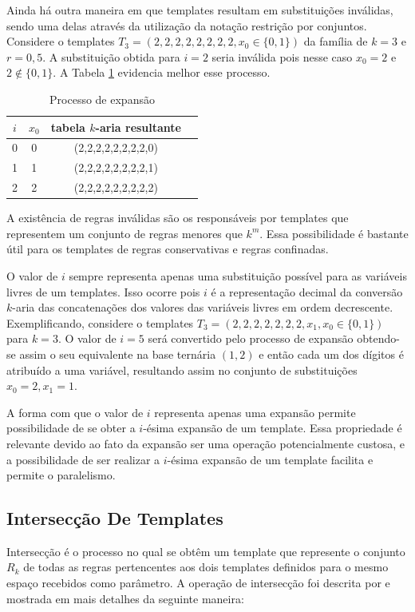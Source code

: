 \documentclass[12pt,a4paper]{article}
\begin{document}
	Ainda há outra maneira em que templates resultam em substituições inválidas, sendo uma delas através da utilização da notação restrição por conjuntos. Considere o templates $T_3 = (2,2,2,2,2,2,2,2,x_0\in \{0,1\})$ da família de $k=3$ e $r=0,5$. A substituição obtida para $i = 2$ seria inválida pois nesse caso $x_0 = 2$ e $2 \notin \{0,1\}$. A Tabela \ref{tab:invalideExpansion2} evidencia melhor esse processo.

	\begin{table}[h!]
	\centering
	\caption{Processo de expansão}
	{
		\vspace{0.3cm}
		\begin{tabular}{cccc}
		\hline
		$i$ & $x_0$ & tabela $k$-aria resultante \\
		\hline
		0	&	0	&	(2,2,2,2,2,2,2,2,0)	\\
		1	&	1	&	(2,2,2,2,2,2,2,2,1)	\\
		2	&	2	&	(2,2,2,2,2,2,2,2,2)	\\
		\hline
		\end{tabular}
	}
	\label{tab:invalideExpansion2}
	\end{table}

	A existência de regras inválidas são os responsáveis por templates que representem um conjunto de regras menores que $k^m$. Essa possibilidade é bastante útil para os templates de regras conservativas e regras confinadas.

	O valor de $i$ sempre representa apenas uma substituição possível para as variáveis livres de um templates. Isso ocorre pois $i$ é a representação decimal da conversão $k$-aria das concatenações dos valores das variáveis livres em ordem decrescente. Exemplificando, considere o templates $T_3 = (2,2,2,2,2,2,2,x_1,x_0\in \{0,1\})$ para $k=3$. O valor de $i=5$ será convertido pelo processo de expansão obtendo-se assim o seu equivalente na base ternária $(1,2)$ e então cada um dos dígitos é atribuído a uma variável, resultando assim no conjunto de substituições ${x_0=2,x_1=1}$.

	A forma com que o valor de $i$ representa apenas uma expansão permite possibilidade de se obter a $i$-ésima expansão de um template. Essa propriedade é relevante devido ao fato da expansão ser uma operação potencialmente custosa, e a possibilidade de ser realizar a $i$-ésima expansão de um template facilita e permite o paralelismo.

\newpage\newpage
\subsection{Intersecção De Templates}%
	Intersecção é o processo no qual se obtêm um template que represente o conjunto $R_k$ de todas as regras pertencentes aos dois templates definidos para o mesmo espaço recebidos como parâmetro. A operação de intersecção foi descrita por  e mostrada em mais detalhes da seguinte maneira:
\end{document}
